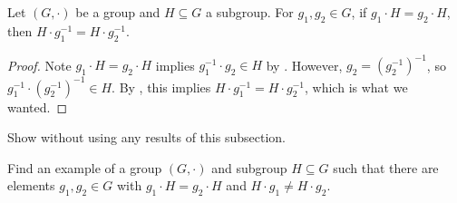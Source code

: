 \documentclass[../main.tex]{subfiles}
\begin{document}
\begin{corollary} \label{cor:left-to-right-coset}
    Let $(G,\cdot)$ be a group and $H\subseteq G$ a subgroup. For $g_1,g_2\in G$, if $g_1\cdot H=g_2\cdot H$, then $H\cdot g_1^{-1}=H\cdot g_2^{-1}$.
\end{corollary}
\begin{proof}
    Note $g_1\cdot H=g_2\cdot H$ implies $g_1^{-1}\cdot g_2\in H$ by . However, $g_2=\left(g_2^{-1}\right)^{-1}$, so $g_1^{-1}\cdot\left(g_2^{-1}\right)^{-1}\in H$. By , this implies $H\cdot g_1^{-1}=H\cdot g_2^{-1}$, which is what we wanted.
\end{proof}
\begin{exe}
    Show  without using any results of this subsection.
\end{exe}
\begin{exe}
    Find an example of a group $(G,\cdot)$ and subgroup $H\subseteq G$ such that there are elements $g_1,g_2\in G$ with $g_1\cdot H=g_2\cdot H$ and $H\cdot g_1\ne H\cdot g_2$.
\end{exe}
\end{document}
